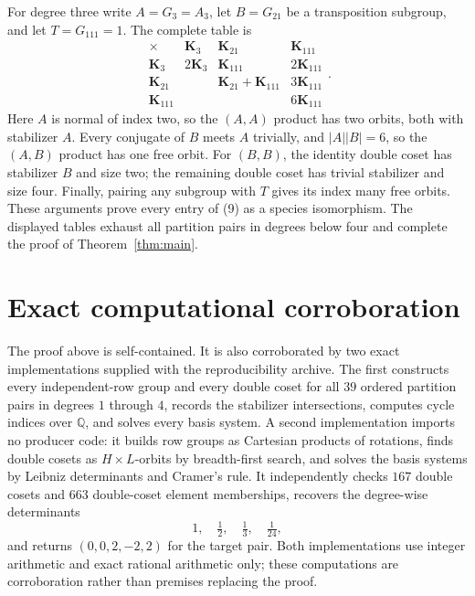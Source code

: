 \documentclass[11pt]{article}
\begin{document}
For degree three write $A=G_3=A_3$, let $B=G_{21}$ be a transposition
subgroup, and let $T=G_{111}=1$.  The complete table is
\begin{equation}
\begin{array}{c|ccc}
\times&\mathbf{K}_3&\mathbf{K}_{21}&\mathbf{K}_{111}\\ \hline
\mathbf{K}_3&2\mathbf{K}_3&\mathbf{K}_{111}&2\mathbf{K}_{111}\\
\mathbf{K}_{21}&&\mathbf{K}_{21}+\mathbf{K}_{111}&3\mathbf{K}_{111}\\
\mathbf{K}_{111}&&&6\mathbf{K}_{111}
\end{array}. \label{eq:degree-three-table}
\end{equation}
Here $A$ is normal of index two, so the $(A,A)$ product has two orbits, both
with stabilizer $A$.  Every conjugate of $B$ meets $A$ trivially, and
$|A||B|=6$, so the $(A,B)$ product has one free orbit.  For $(B,B)$, the
identity double coset has stabilizer $B$ and size two; the remaining double
coset has trivial stabilizer and size four.  Finally, pairing any subgroup
with $T$ gives its index many free orbits.  These arguments prove every
entry of (9) as a species isomorphism.  The displayed tables exhaust all
partition pairs in degrees below four and complete the proof of
Theorem~\ref{thm:main}.

\section{Exact computational corroboration}

The proof above is self-contained.  It is also corroborated by two exact
implementations supplied with the reproducibility archive.  The first
constructs every independent-row group and every double coset for all $39$
ordered partition pairs in degrees $1$ through $4$, records the stabilizer
intersections, computes cycle indices over $\mathbb Q$, and solves every
basis system.  A second implementation imports no producer code: it builds
row groups as Cartesian products of rotations, finds double cosets as
$H\times L$-orbits by breadth-first search, and solves the basis systems by
Leibniz determinants and Cramer's rule.  It independently checks $167$
double cosets and $663$ double-coset element memberships, recovers the
degree-wise determinants
\[
 1,\quad \tfrac12,\quad \tfrac13,\quad \tfrac1{24},
\]
and returns $(0,0,2,-2,2)$ for the target pair.  Both implementations use
integer arithmetic and exact rational arithmetic only; these computations
are corroboration rather than premises replacing the proof.
\end{document}
